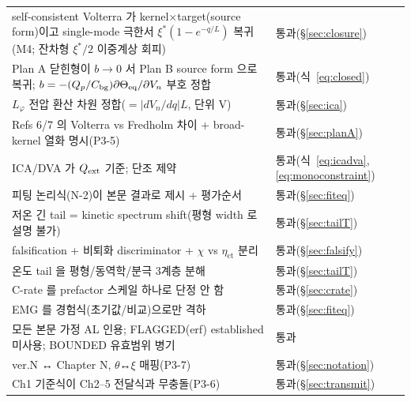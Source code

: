 \begin{longtable}{p{} p{}}
self-consistent Volterra 가 kernel$\times$target(source form)이고 single-mode 극한서 $\xi^\ast(1-e^{-q/L})$ 복귀(M4; 잔차형 $\xi^\ast/2$ 이중계상 회피) & 통과(\S\ref{sec:closure}) \\
Plan A 닫힌형이 $b\to0$ 서 Plan B source form 으로 복귀; $b=-(Q_p/C_{\mathrm{bg}})\partial\Theta_{\mathrm{eq}}/\partial V_n$ 부호 정합 & 통과(식~\eqref{eq:closed}) \\
$L_\varphi$ 전압 환산 차원 정합($=|dV_n/dq|L$, 단위 V) & 통과(\S\ref{sec:ica}) \\
Refs 6/7 의 Volterra vs Fredholm 차이 + broad-kernel 열화 명시(P3-5) & 통과(\S\ref{sec:planA}) \\
ICA/DVA 가 $Q_{\mathrm{ext}}$ 기준; 단조 제약 & 통과(식~\eqref{eq:icadva},\eqref{eq:monoconstraint}) \\
피팅 논리식(N-2)이 본문 결과로 제시 + 평가순서 & 통과(\S\ref{sec:fiteq}) \\
저온 긴 tail = kinetic spectrum shift(평형 width 로 설명 불가) & 통과(\S\ref{sec:tailT}) \\
falsification + 비퇴화 discriminator + $\chi$ vs $\eta_\mathrm{ct}$ 분리 & 통과(\S\ref{sec:falsify}) \\
온도 tail 을 평형/동역학/분극 3계층 분해 & 통과(\S\ref{sec:tailT}) \\
C-rate 를 prefactor 스케일 하나로 단정 안 함 & 통과(\S\ref{sec:crate}) \\
EMG 를 경험식(초기값/비교)으로만 격하 & 통과(\S\ref{sec:fiteq}) \\
모든 본문 가정 AL 인용; FLAGGED(erf) established 미사용; BOUNDED 유효범위 병기 & 통과 \\
ver.N ↔ Chapter N, $\theta$↔$\xi$ 매핑(P3-7) & 통과(\S\ref{sec:notation}) \\
Ch1 기준식이 Ch2--5 전달식과 무충돌(P3-6) & 통과(\S\ref{sec:transmit}) \\
\bottomrule
\end{longtable}


